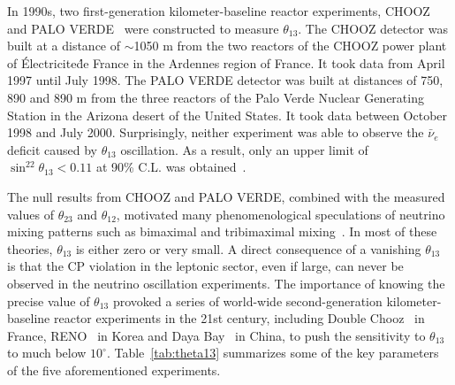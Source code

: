 \documentclass[aps,twocolumn,preprintnumbers,amsmath,superscriptaddress,amssymb,floats,nofootinbib]{revtex4-1}
\begin{document}
In 1990s, two first-generation kilometer-baseline reactor experiments, CHOOZ~\cite{Chooz} and PALO VERDE~\cite{Paloverde} were constructed to measure $\theta_{13}$. 
The CHOOZ detector was built at a distance of $\sim$1050 m from the two reactors of the CHOOZ power plant of \'{E}lectricite\'{d}e France in the Ardennes region of France. It took data from April 1997 until July 1998. 
The PALO VERDE detector was built at distances of 750, 890 and 890 m from the three reactors of the Palo Verde Nuclear Generating Station in the Arizona desert of the United States. It took data between October 1998 and July 2000. 
Surprisingly, neither experiment was able to observe the $\bar\nu_e$ deficit caused by $\theta_{13}$ oscillation. 
As a result, only an upper limit of $\sin^22\theta_{13} < 0.11$ at 90\% C.L. was obtained~\cite{Chooz}.

The null results from CHOOZ and PALO VERDE, combined with the measured values of $\theta_{23}$ and $\theta_{12}$, motivated many phenomenological speculations of neutrino mixing patterns such as bimaximal and tribimaximal mixing~\cite{Harrison,Altarelli}. 
In most of these theories, $\theta_{13}$ is either zero or very small. 
A direct consequence of a vanishing $\theta_{13}$ is that the CP violation in the leptonic sector, even if large, can never be observed in the neutrino oscillation experiments. 
The importance of knowing the precise value of $\theta_{13}$ provoked a series of world-wide second-generation kilometer-baseline reactor experiments in the 21st century, including Double Chooz~\cite{DChooz} in France, RENO~\cite{Reno} in Korea and Daya Bay~\cite{Dayabay} in China, to push the sensitivity to $\theta_{13}$ to much below $10^\circ$. 
Table~\ref{tab:theta13} summarizes some of the key parameters of the five aforementioned experiments.
\end{document}
